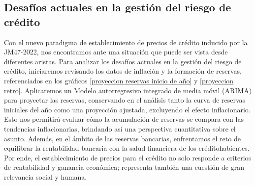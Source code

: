 \subsection{Desafíos actuales en la gestión del riesgo de crédito}


Con el nuevo paradigma de establecimiento de precios de crédito inducido por la JM47-2022, nos encontramos ante una situación que puede ser vista desde diferentes aristas.  Para analizar los desafíos actuales en la gestión del riesgo de crédito, iniciaremos revisando los datos de inflación y la formación de reservas, referenciados en los gráficos \ref{proyeccion reservas inicio de año} y \ref{proyeccion retro}. Aplicaremos un Modelo autorregresivo integrado de media móvil (ARIMA) para proyectar las reservas, conservando en el análisis tanto la curva de reservas iniciales del año como una proyección ajustada, excluyendo el efecto inflacionario. Esto nos permitirá evaluar cómo la acumulación de reservas se compara con las tendencias inflacionarias, brindando así una perspectiva cuantitativa sobre el asunto. Además, en el ámbito de las reservas bancarias, enfrentamos el reto de equilibrar la rentabilidad bancaria con la salud financiera de los créditohabientes. Por ende, el establecimiento de precios para el crédito no solo responde a criterios de rentabilidad y ganancia económica; representa también una cuestión de gran relevancia social y humana.

